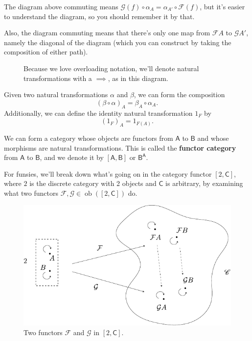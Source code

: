 \documentclass[10pt]{report}
\newcommand{\cat}[1]{\mathsf{#1}}
\DeclareMathOperator{\ob}{ob}
\begin{document}
The diagram above commuting means $\mathcal{G}(f) \circ \alpha_A = \alpha_{A'} \circ \mathcal{F}(f)$, but it's easier to understand the diagram, so you should remember it by that.

Also, the diagram commuting means that there's only one map from $\mathcal{F}A$ to $\mathcal{G}A'$, namely the diagonal of the diagram (which you can construct by taking the composition of either path).

\begin{figure}[H]
	\centering
	\caption{Because we love overloading notation, we'll denote natural transformations with a $\implies$, as in this diagram.}
\end{figure}

Given two natural transformations $\alpha$ and $\beta$, we can form the composition
\[
	(\beta \circ \alpha)_A = \beta_A \circ \alpha_A.
\] Additionally, we can define the identity natural transformation $1_F$ by
\[
	(1_F)_A = 1_{F(A)}.
\] 

\begin{ex}
	We can form a category whose objects are functors from $\cat{A}$ to $\cat{B}$ and whose morphisms are natural transformations. This is called the \textbf{functor category} from $\cat{A}$ to $\cat{B}$, and we denote it by $[\cat{A},\cat{B}]$ or $\cat{B}^{\cat{A}}$.
\end{ex}

	For funsies, we'll break down what's going on in the category functor $[2, \cat{C}]$, where $2$ is the discrete category with 2 objects and $\cat{C}$ is arbitrary, by examining what two functors $\mathcal{F}, \mathcal{G} \in \ob([2, \cat{C}])$ do.

\begin{figure}[H]
	\centering
	\includegraphics[scale=1]{fig/functor-cat.pdf}
	\caption{Two functors $\mathcal{F}$ and $\mathcal{G}$ in $[2,\cat{C}]$.}
\end{figure}
\end{document}
